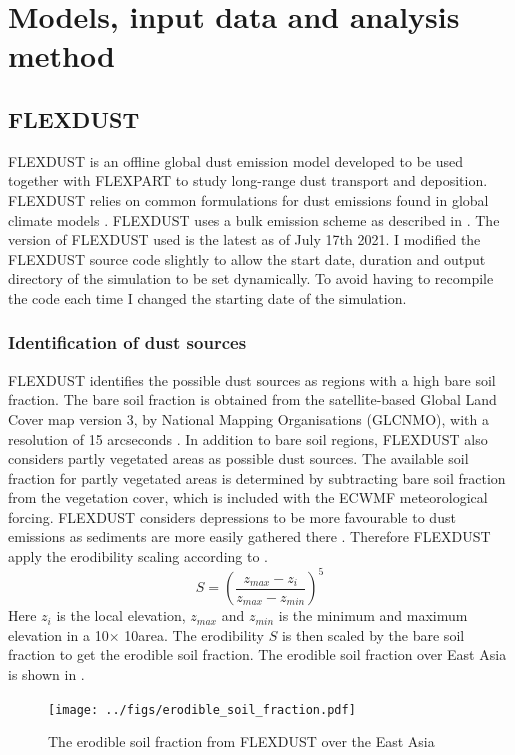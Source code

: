 \chapter{Models, input data and analysis method}\label{chap:methods}

\section{FLEXDUST}\label{sec:flexdust}
FLEXDUST is an offline global dust emission model developed to be used together 
with FLEXPART to study long-range dust transport and deposition. FLEXDUST relies on common 
formulations for dust emissions found in global climate models \parencite{flexdust_ref_2016}.
FLEXDUST uses a bulk emission scheme as described in .
The version of FLEXDUST used is the latest as of July 17th 2021. 
I modified the FLEXDUST source code slightly to allow the start date, duration and output directory of the simulation to be set dynamically. 
To avoid having to recompile the code each time I changed the starting date of the simulation.  

\subsection{Identification of dust sources}
FLEXDUST identifies the possible dust sources as regions with a high bare soil fraction. 
The bare soil fraction is obtained from the satellite-based Global Land Cover map version 3, by National Mapping Organisations (GLCNMO), with a 
resolution of 15 arcseconds \parencite{shirahata2017production}.
In addition to bare soil regions, FLEXDUST also considers partly vegetated areas as possible
dust sources. The available soil fraction for partly vegetated areas is determined by
subtracting bare soil fraction from the vegetation cover, which is included with the ECWMF meteorological forcing.
FLEXDUST considers depressions to be more favourable to dust emissions as sediments are more easily gathered there \parencite{zender2003mineral}. Therefore FLEXDUST apply the erodibility scaling 
 according to \textcite{dust_dist_Ginoux2001}. 
\begin{equation}\label{eq_ero_soil_frac}
    S = \left(\frac{z_{max} - z_i}{z_{max} - z_{min}}\right)^5 
\end{equation}    
Here $z_i$ is the local elevation, $z_{max}$ and $z_{min}$ is the minimum and
maximum elevation in a 10\degree $\times$ 10\degree area.  The erodibility $S$ is
then scaled by the bare soil fraction to get the erodible soil fraction. The erodible soil fraction over East Asia is shown in . 
\begin{figure}[hptb]
    \centering
    \texttt{[image: ../figs/erodible\_soil\_fraction.pdf]}
    \caption{The erodible soil fraction from FLEXDUST over the East Asia}
    \label{fig:erodible_soil_fraction_EA}
\end{figure}
